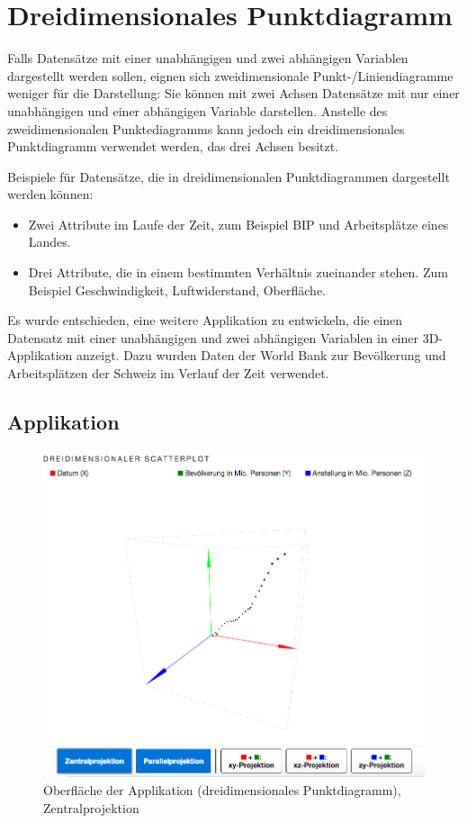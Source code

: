 \section{Dreidimensionales Punktdiagramm}

Falls Datensätze mit einer unabhängigen und zwei abhängigen Variablen dargestellt werden sollen, eignen sich zweidimensionale Punkt-/Liniendiagramme weniger für die Darstellung: Sie können mit zwei Achsen Datensätze mit nur einer unabhängigen und einer abhängigen Variable darstellen. Anstelle des zweidimensionalen Punktediagramms kann jedoch ein dreidimensionales Punktdiagramm verwendet werden, das drei Achsen besitzt.

Beispiele für Datensätze, die in dreidimensionalen Punktdiagrammen dargestellt werden können:

\begin{itemize}
	\item Zwei Attribute im Laufe der Zeit, zum Beispiel BIP und Arbeitsplätze eines Landes.
	\item Drei Attribute, die in einem bestimmten Verhältnis zueinander stehen. Zum Beispiel Geschwindigkeit, Luftwiderstand, Oberfläche.
\end{itemize}

Es wurde entschieden, eine weitere Applikation zu entwickeln, die einen Datensatz mit einer unabhängigen und zwei abhängigen Variablen in einer 3D-Applikation anzeigt. Dazu wurden Daten der World Bank \cite{worldbank} zur Bevölkerung und Arbeitsplätzen der Schweiz im Verlauf der Zeit verwendet.

\subsection{Applikation}

\begin{figure}[H]
	\centering
	\includegraphics[width=\linewidth]{images/3d}
	\caption{Oberfläche der Applikation (dreidimensionales Punktdiagramm), Zentralprojektion}
	\label{fig:3d}
\end{figure}

